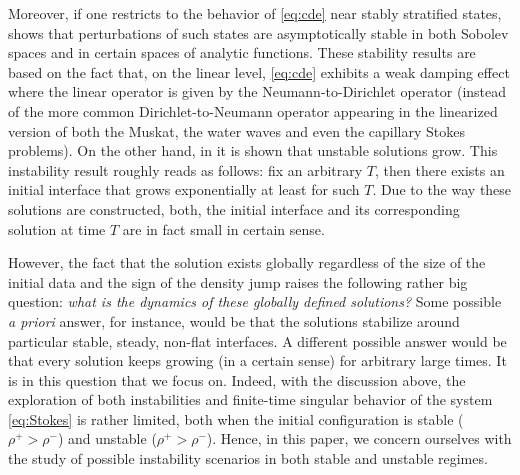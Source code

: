 \documentclass[11pt]{article}
\numberwithin{equation}{section}
\begin{document}
Moreover, if one restricts to the behavior of \eqref{eq:cde} near stably stratified states, \cite{GGS25_SIMA} shows that perturbations of such states are asymptotically stable in both Sobolev spaces and in certain spaces of analytic functions. These stability results are based on the fact that, on the linear level, \eqref{eq:cde} exhibits a weak damping effect where the linear operator is given by the Neumann-to-Dirichlet operator (instead of the more common Dirichlet-to-Neumann operator appearing in the linearized version of both the Muskat, the water waves and even the capillary Stokes problems). On the other hand, in \cite{GGS25_SIMA} it is shown that unstable solutions grow. This instability result roughly reads as follows: fix an arbitrary $T$, then there exists an initial interface that grows exponentially at least for such $T$. Due to the way these solutions are constructed, both, the initial interface and its corresponding solution at time $T$ are in fact small in certain sense.

However, the fact that the solution exists globally regardless of the size of the initial data and the sign of the density jump raises the following rather big question: \emph{what is the dynamics of these globally defined solutions?} Some possible \emph{a priori} answer, for instance, would be that the solutions stabilize around particular stable, steady, non-flat interfaces. A different possible answer would be that every solution keeps growing (in a certain sense) for arbitrary large times. It is in this question that we focus on. Indeed, with the discussion above, the exploration of both instabilities and finite-time singular behavior of the system \eqref{eq:Stokes} is rather limited, both when the initial configuration is stable ($\rho^+ > \rho^-$) and unstable ($\rho^+ > \rho^-$). Hence, in this paper, we concern ourselves with the study of possible instability scenarios in both stable and unstable regimes. 
\end{document}
